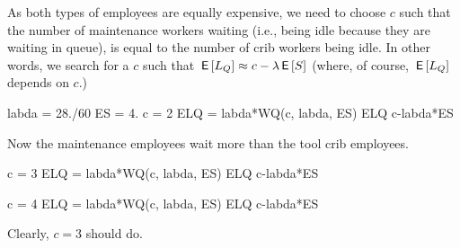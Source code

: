 \begin{exercise}
\begin{solution}
As both types of
employees are equally expensive, we need to choose $c$ such that
the number of maintenance workers waiting (i.e., being idle because they are waiting in queue), is  equal to the number of crib workers being idle. In other words, we search for a $c$ such that $\,\mathsf{E}\left[L_Q\right] \approx c- \lambda \,\mathsf{E}\left[S\right]$ (where, of course, $\,\mathsf{E}\left[L_Q\right]$ depends on $c$.)


\begin{pyconsole}
labda = 28./60
ES = 4.
c = 2
ELQ = labda*WQ(c, labda, ES)
ELQ
c-labda*ES
\end{pyconsole} 
Now the maintenance employees wait more than the tool crib employees.

\begin{pyconsole}
c = 3
ELQ = labda*WQ(c, labda, ES)
ELQ
c-labda*ES
\end{pyconsole} 

\begin{pyconsole}
c = 4
ELQ = labda*WQ(c, labda, ES)
ELQ
c-labda*ES
\end{pyconsole} 

Clearly, $c=3$ should do.
    \end{solution}
\end{exercise}







